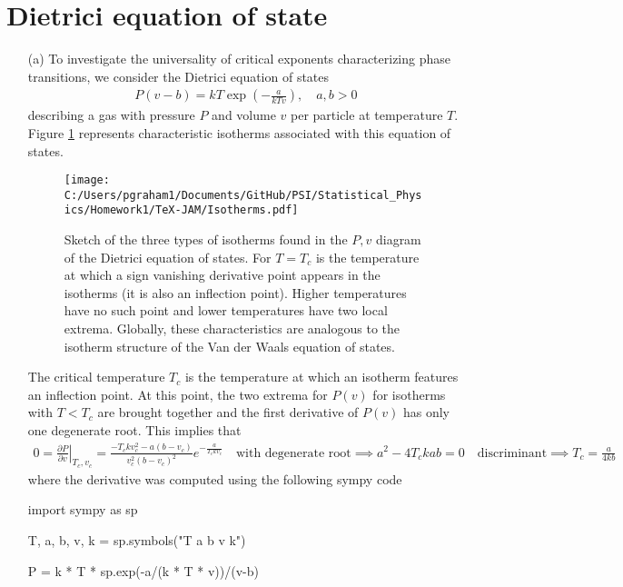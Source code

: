 \documentclass[10pt, a4paper]{article}
\begin{document}
{\section{Dietrici equation of state}
\begin{enumerate}
  \item[(a)] To investigate the universality of critical exponents characterizing phase transitions, we consider the Dietrici equation of states 
  \begin{align*}
    P(v-b) = kT \exp\left(-\frac{a}{kT v}\right), \quad a, b > 0
  \end{align*} 
  describing a gas with pressure $P$ and volume $v$ per particle at temperature $T$. Figure \ref{f1} represents characteristic isotherms associated with this equation of states. 

  \begin{figure}[h!]
    \centering
    \texttt{[image: C:/Users/pgraham1/Documents/GitHub/PSI/Statistical\_Physics/Homework1/TeX-JAM/Isotherms.pdf]}
    \caption{\label{f1} Sketch of the three types of isotherms found in the $P, v$ diagram of the Dietrici equation of states. For $T=T_c$ is the temperature at which a sign vanishing derivative point appears in the isotherms (it is also an inflection point). Higher temperatures have no such point and lower temperatures have two local extrema. Globally, these characteristics are analogous to the isotherm structure of the Van der Waals equation of states.}
  \end{figure}

  The critical temperature $T_c$ is the temperature at which an isotherm features an inflection point. At this point, the two extrema for $P(v)$ for isotherms with $T < T_c$ are brought together and the first derivative of  $P(v)$ has only one degenerate root. This implies that  
  \begin{align*}
    0 = \left.\frac{\partial P}{\partial v}\right|_{T_c, v_c} = \frac{- T_c k v_c^{2} - a \left(b - v_c\right)}{v_c^{2} \left(b - v_c\right)^{2}} e^{- \frac{a}{T_c k v_c}} \quad \text{with degenerate root} \implies a^2 - 4 T_c k a b = 0 \quad \text{discriminant}\implies T_c = \frac{a}{4k b}
  \end{align*}
  where the derivative was computed using the following sympy code 
  \begin{python}
import sympy as sp 

T, a, b, v, k = sp.symbols("T a b v k")

P = k * T * sp.exp(-a/(k * T * v))/(v-b)


\end{python}
\end{enumerate}}
\end{document}
